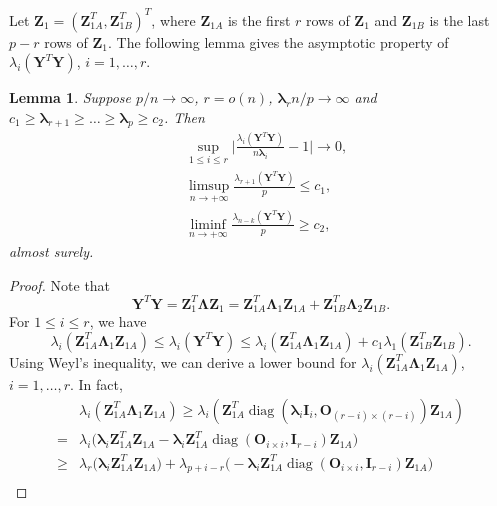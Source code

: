 \documentclass[12pt]{article} %
\DeclareMathOperator{\mydiag}{diag}
\newcommand{\bZ}{\mathbf{Z}}
\newcommand{\bA}{\mathbf{A}}
\newcommand{\bY}{\mathbf{Y}}
\newcommand{\bO}{\mathbf{O}}
\newcommand{\bI}{\mathbf{I}}
\newcommand{\bD}{\mathbf{D}}
\newcommand{\bV}{\mathbf{V}}
\newcommand{\bfsym}[1]{\ensuremath{\boldsymbol{#1}}}
\def\blambda {\bfsym {\lambda}}
\def\bLambda {\bfsym {\Lambda}}
\newtheorem{lemma}{Lemma}
\theoremstyle{definition}
\begin{document}
\begin{appendices}
Let $\bZ_1=(\bZ_{1A}^T,\bZ_{1B}^T)^T$, where $\bZ_{1A}$ is the first $r$ rows of $\bZ_1$ and $\bZ_{1B}$ is the last $p-r$ rows of $\bZ_1$.
The following lemma gives the asymptotic property of $\lambda_{i}(\bY^T \bY)$, $i=1,\ldots, r$.
\begin{lemma}\label{PCAlemma1}
    Suppose $p/n\to \infty$, $r=o(n)$, $\blambda_r n/p\to \infty$ and $c_1\geq\blambda_{r+1}\geq \ldots \geq \blambda_p\geq c_2$. 
    Then
    \begin{align}
        &\sup_{1\leq i\leq r}\Big|\frac{\lambda_{i}(\bY^T \bY)}{n\blambda_i}-1\Big|\to 0,\label{PCAlemma1:eq1}\\
        &\limsup_{n\to +\infty}\frac{\lambda_{r+1}(\bY^T\bY)}{p}\leq c_1,\label{PCAlemma1:eq2}\\
        &\liminf_{n\to +\infty}\frac{\lambda_{n-k}(\bY^T\bY)}{p}\geq c_2,\label{PCAlemma1:eq3}
    \quad
    \end{align}
    almost surely.
\end{lemma}
\begin{proof}
    Note that
$$
\bY^T \bY =\bZ_1^T \bLambda \bZ_1
=
\bZ_{1A}^T \bLambda_1 \bZ_{1A}+
\bZ_{1B}^T \bLambda_2 \bZ_{1B}.
$$
For $1\leq i \leq r$, we have
    \begin{equation}\label{eq:DLU}
\lambda_i(\bZ_{1A}^T \bLambda_1 \bZ_{1A})
    \leq \lambda_i(\bY^T \bY) \leq \lambda_i(\bZ_{1A}^T \bLambda_1 \bZ_{1A})+
    c_1 \lambda_1(\bZ_{1B}^T  \bZ_{1B}).
    \end{equation}
 Using Weyl's inequality, we can derive a lower bound for $\lambda_i(\bZ_{1A}^T \bLambda_1 \bZ_{1A})$, $ i=1,\ldots, r$. In fact,
\begin{equation}\label{eq:DLower}
\begin{aligned}
&\lambda_i(\bZ_{1A}^T \bLambda_1 \bZ_{1A})
\geq
\lambda_i(\bZ_{1A}^T \mydiag(\blambda_i \bI_{i},\bO_{(r-i)\times(r-i)}) \bZ_{1A})
\\
    =&
    \lambda_i\Big( \blambda_i \bZ_{1A}^T \bZ_{1A}-\blambda_i\bZ_{1A}^T \mydiag(\bO_{i\times i}, \bI_{r-i}) \bZ_{1A}\Big)\\
    \geq&
    \lambda_r\Big( \blambda_i \bZ_{1A}^T \bZ_{1A}\Big)+\lambda_{p+i-r}\Big(-\blambda_i\bZ_{1A}^T \mydiag(\bO_{i\times i}, \bI_{r-i}) \bZ_{1A}\Big)\\

\end{aligned}
\end{equation}
\end{proof}
\end{appendices}
\end{document}
